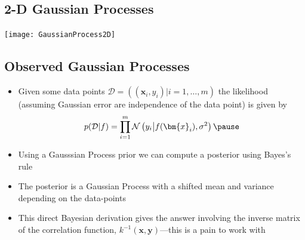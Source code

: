 \begin{slide}
\section{2-D Gaussian Processes}

\begin{center}
  \texttt{[image: GaussianProcess2D]}
\end{center}

\end{slide}



\Outline %

\begin{slide}
\section[-2]{Observed Gaussian Processes}

\begin{PauseHighLight}
  \begin{itemize}
  \item Given some data points
    $\mathcal{D} = \left( (\bm{x}_i, y_i) \big\vert i=1,\ldots, m
    \right)$ the likelihood (assuming Gaussian error are independence
    of the data point) is given by\vspace*{-0.3cm}
    \begin{align*}
      p(\mathcal{D}| f) = \prod_{i=1}^m
      \mathcal{N}\left(y_i\big\vert f(\bm{x}_i), \sigma^2\right)\pause
    \end{align*}\vspace*{-1.3cm}
  \item Using a Gausssian Process prior we can compute a posterior
    using Bayes's rule\pause
  \item The posterior is a Gaussian Process with a shifted mean and
    variance depending on the data-points\pause
  \item This direct Bayesian derivation gives the answer involving the
    inverse matrix of the correlation function,
    $k^{-1}(\bm{x}, \bm{y})$\pause---this is a pain to work
    with\pauseb
  \end{itemize}
\end{PauseHighLight}

\end{slide}


